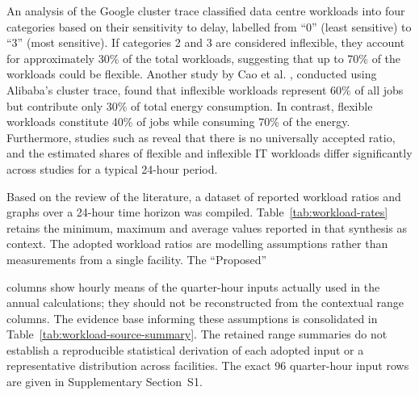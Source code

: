 \documentclass[lettersize,journal]{IEEEtran}
\providecommand{\DIFadd}[1]{{\color{blue}#1}}
\providecommand{\DIFaddbegin}{}
\providecommand{\DIFaddend}{}
\begin{document}
  \DIFaddbegin \DIFadd{An analysis of the Google cluster trace }\DIFaddend \cite{6779441} classified data centre workloads into four categories based on their sensitivity to delay, labelled from ``0'' (least sensitive) to ``3'' (most sensitive). If categories 2 and 3 are considered inflexible, they account for approximately 30\% of the total workloads, suggesting that up to 70\% of the workloads could be flexible. Another study by Cao et al. \cite{Cao2022ApEn}, conducted using Alibaba’s cluster trace, found that inflexible workloads represent 60\% of all jobs but contribute only 30\% of total energy consumption. In contrast, flexible workloads constitute 40\% of jobs while consuming 70\% of the energy. Furthermore, studies such as \cite{Misaghian2023TIA,Xu2023SPIE,Zhou2024IJEPES,Fu2020ApEn,Liu2012PER} reveal that there is no universally accepted ratio, and the estimated shares of flexible and inflexible IT workloads differ significantly across studies for a typical 24-hour period. 

Based on the review of the literature, a dataset of reported workload ratios and graphs over a 24-hour time horizon was compiled.  \DIFaddbegin \DIFadd{Table~\ref{tab:workload-rates} retains the minimum, maximum and average values reported in that synthesis as context. The adopted workload ratios are modelling assumptions rather than measurements from a single facility. The }\DIFaddend ``Proposed''  \DIFaddbegin \DIFadd{columns show hourly means of the quarter-hour inputs actually used in the annual calculations; they should not be reconstructed from the contextual range columns. The evidence base informing these assumptions is consolidated in Table~\ref{tab:workload-source-summary}. The retained range summaries do not establish a reproducible statistical derivation of each adopted input or a representative distribution across facilities. The exact 96 quarter-hour input rows are given in Supplementary Section~S1.

}\DIFaddend 
\end{document}
